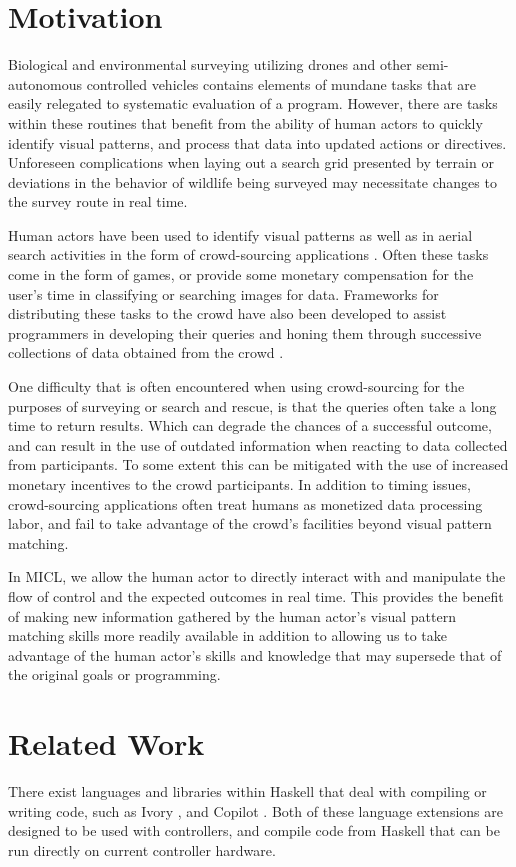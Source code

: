 \documentclass{sig-alternate-05-2015}
\begin{document}
\section{Motivation}
\label{sec:motivation}
Biological and environmental surveying utilizing drones and other semi-autonomous
controlled vehicles contains elements of mundane tasks that are easily
relegated to systematic evaluation of a program. However, there are tasks
within these routines that benefit from the ability of human actors to quickly
identify visual patterns, and process that data into updated actions or
directives. Unforeseen complications when laying out a search grid presented
by terrain or deviations in the behavior of wildlife being surveyed may
necessitate changes to the survey route in real time.

Human actors have been used to identify visual patterns as well as in aerial
search activities in the form of crowd-sourcing applications
\cite{quinn2011hc}. Often these tasks come in the form of games, or provide
some monetary compensation for the user's time in classifying or searching
images for data. Frameworks for distributing these tasks to the crowd have
also been developed to assist programmers in developing their queries and
honing them through successive collections of data obtained from the crowd
\cite{little2010turkit}.

One difficulty that is often encountered when using crowd-sourcing for the
purposes of surveying or search and rescue, is that the queries often take a
long time to return results. Which can degrade the chances of a successful
outcome, and can result in the use of outdated information when reacting to
data collected from participants. To some extent this can be mitigated with
the use of increased monetary incentives to the crowd participants. In
addition to timing issues, crowd-sourcing applications often treat humans as
monetized data processing labor, and fail to take advantage of the crowd's
facilities beyond visual pattern matching.

In MICL, we allow the human actor to directly interact with and manipulate the
flow of control and the expected outcomes in real time. This provides the
benefit of making new information gathered by the human actor's visual pattern
matching skills more readily available in addition to allowing us to take
advantage of the human actor's skills and knowledge that may supersede that of
the original goals or programming.


\section{Related Work}
\label{sec:related}
There exist languages and libraries within Haskell that deal with compiling or
writing  code, such as Ivory \cite{elliot2015ivory}, and Copilot
\cite{pike2010copilot}. Both of these language extensions are designed to be
used with controllers, and compile  code from Haskell that can be
run directly on current controller hardware.
\end{document}
